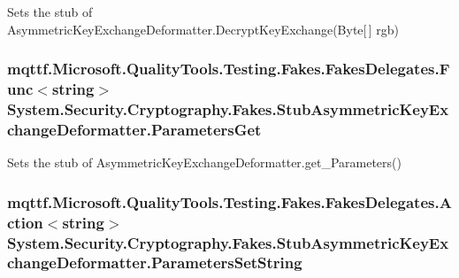 Sets the stub of Asymmetric\-Key\-Exchange\-Deformatter.\-Decrypt\-Key\-Exchange(\-Byte\mbox{[}$\,$\mbox{]} rgb)

\hypertarget{class_system_1_1_security_1_1_cryptography_1_1_fakes_1_1_stub_asymmetric_key_exchange_deformatter_a5a6ac184f4266db967e55b33f870329d}{
\subsubsection[{Parameters\-Get}]{\setlength{\rightskip}{0pt plus 5cm}mqttf.\-Microsoft.\-Quality\-Tools.\-Testing.\-Fakes.\-Fakes\-Delegates.\-Func$<$string$>$ System.\-Security.\-Cryptography.\-Fakes.\-Stub\-Asymmetric\-Key\-Exchange\-Deformatter.\-Parameters\-Get}}\label{class_system_1_1_security_1_1_cryptography_1_1_fakes_1_1_stub_asymmetric_key_exchange_deformatter_a5a6ac184f4266db967e55b33f870329d}


Sets the stub of Asymmetric\-Key\-Exchange\-Deformatter.\-get\-\_\-\-Parameters()

\hypertarget{class_system_1_1_security_1_1_cryptography_1_1_fakes_1_1_stub_asymmetric_key_exchange_deformatter_a17acbe2fef33ff1142e12d5718636686}{
\subsubsection[{Parameters\-Set\-String}]{\setlength{\rightskip}{0pt plus 5cm}mqttf.\-Microsoft.\-Quality\-Tools.\-Testing.\-Fakes.\-Fakes\-Delegates.\-Action$<$string$>$ System.\-Security.\-Cryptography.\-Fakes.\-Stub\-Asymmetric\-Key\-Exchange\-Deformatter.\-Parameters\-Set\-String}}\label{class_system_1_1_security_1_1_cryptography_1_1_fakes_1_1_stub_asymmetric_key_exchange_deformatter_a17acbe2fef33ff1142e12d5718636686}


